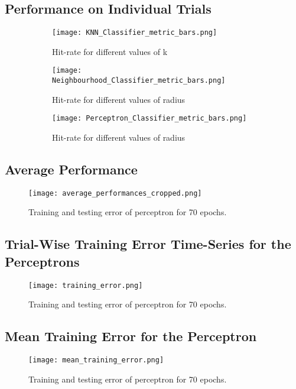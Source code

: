 \documentclass[a4paper,11pt]{article}
\begin{document}
\subsection{Performance on Individual Trials}
\begin{figure}[ht]
    \centering
    \begin{subfigure}[b]{1\linewidth}
        \texttt{[image: KNN\_Classifier\_metric\_bars.png]}
        \caption{Hit-rate for different values of k}
        \label{fig:3.1a}
    \end{subfigure}
    \begin{subfigure}[b]{1\linewidth}
        \texttt{[image: Neighbourhood\_Classifier\_metric\_bars.png]}
        \caption{Hit-rate for different values of radius}
        \label{fig:3.1b}
    \end{subfigure}
    \begin{subfigure}[b]{1\linewidth}
        \texttt{[image: Perceptron\_Classifier\_metric\_bars.png]}
        \caption{Hit-rate for different values of radius}
        \label{fig:3.1b}
    \end{subfigure}
    \caption{}
    \label{fig:3.1}
\end{figure}

\subsection{Average Performance}
\begin{figure}[H]
    \centering
    \texttt{[image: average\_performances\_cropped.png]}
    \caption{Training and testing error of perceptron for 70 epochs.}
    \label{fig:3.2}
\end{figure}

\subsection{Trial-Wise Training Error Time-Series for the Perceptrons}
\begin{figure}[H]
    \centering
    \texttt{[image: training\_error.png]}
    \caption{Training and testing error of perceptron for 70 epochs.}
    \label{fig:2.1}
\end{figure}

\subsection{Mean Training Error for the Perceptron}
\begin{figure}[H]
    \centering
    \texttt{[image: mean\_training\_error.png]}
    \caption{Training and testing error of perceptron for 70 epochs.}
    \label{fig:2.1}
\end{figure}
\end{document}
